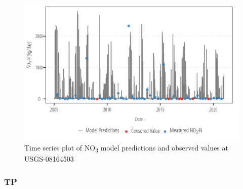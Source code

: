 \documentclass[
]{article}
\begin{document}
\begin{figure}[h]

{\centering \includegraphics{model_assessment_files/figure-pdf/unnamed-chunk-55-1.png}

}

\caption{Time series plot of NO\textsubscript{3} model predictions and
observed values at USGS-08164503}

\end{figure}

\clearpage

\hypertarget{tp-4}{%
\subsubsection{TP}\label{tp-4}}
\end{document}
